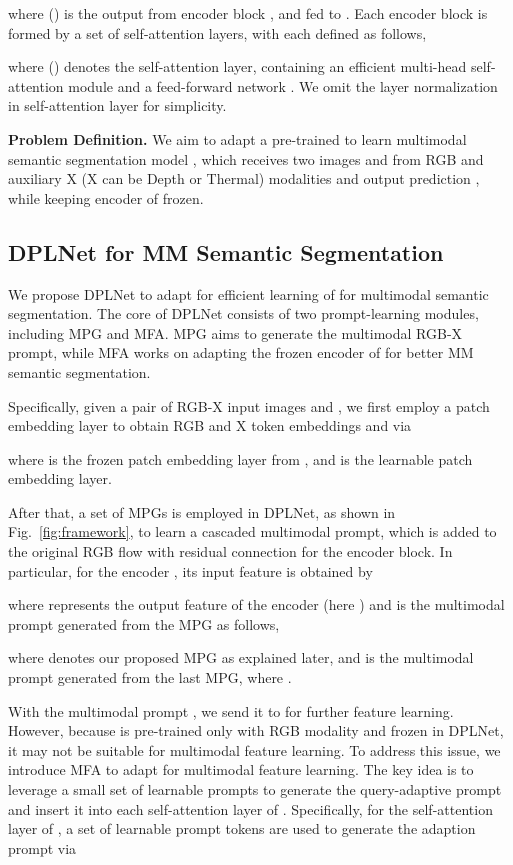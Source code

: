 \documentclass[10pt,twocolumn,letterpaper]{article}
\begin{document}
where  () is the output from encoder block , and fed to . Each encoder block  is formed by a set of  self-attention layers, with each defined as follows,

where  () denotes the  self-attention layer, containing an efficient multi-head self-attention module  and a feed-forward network . We omit the layer normalization in self-attention layer for simplicity.

\textbf{Problem Definition.} We aim to adapt a pre-trained  to learn multimodal semantic segmentation model , which receives two images  and  from RGB and auxiliary X (X can be Depth or Thermal) modalities and output prediction , while keeping encoder of  frozen.


\subsection{DPLNet for MM Semantic Segmentation}
\label{dplnet}

We propose DPLNet to adapt  for efficient learning of  for multimodal semantic segmentation. The core of DPLNet consists of two prompt-learning modules, including MPG and MFA. MPG aims to generate the multimodal RGB-X prompt, while MFA works on adapting the frozen encoder of  for better MM semantic segmentation.

Specifically, given a pair of RGB-X input images  and , we first employ a patch embedding layer to obtain RGB and X token embeddings  and  via

where  is the frozen patch embedding layer from , and  is the learnable patch embedding layer.

After that, a set of MPGs is employed in DPLNet, as shown in Fig.~\ref{fig:framework}, to learn a cascaded multimodal prompt, which is added to the original RGB flow with residual connection for the encoder block. In particular, for the  encoder , its input feature  is obtained by

where  represents the output feature of the  encoder  (here ) and  is the multimodal prompt generated from the  MPG as follows,

where  denotes our proposed MPG as explained later, and  is the multimodal prompt generated from the last MPG, where .

With the multimodal prompt , we send it to  for further feature learning. However, because  is pre-trained only with RGB modality and frozen in DPLNet, it may not be suitable for multimodal feature learning. To address this issue, we introduce MFA to adapt  for multimodal feature learning. The key idea is to leverage a small set of learnable prompts to generate the query-adaptive prompt and insert it into each self-attention layer of . Specifically, for the  self-attention layer  of , a set of learnable prompt tokens  are used to generate the adaption prompt via
\end{document}
